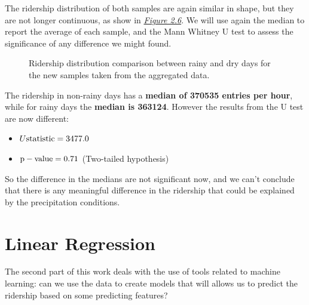 \documentclass[a4paper,12pt,english]{sphinxmanual}
\begin{document}
The ridership distribution of both samples are again similar in shape, but they
are not longer continuous, as show in {\hyperref[section1:figure26]{\emph{Figure 2.6}}}. We will use
again the median to report the average of each sample, and the Mann Whitney U
test to assess the significance of any difference we might found.
\begin{figure}[htbp]
\centering
\capstart

\caption{Ridership distribution comparison between rainy and dry days for the new
samples taken from the aggregated data.}\label{section1:figure26}\end{figure}

The ridership in non-rainy days has a \textbf{median of 370535 entries per hour},
while for rainy days the \textbf{median is 363124}. However the results from the U
test are now different:
\begin{itemize}
\item {} 
\(U \rm{statistic} = 3477.0\)

\item {} 
\(\rm{p-value} = 0.71\) (Two-tailed hypothesis)

\end{itemize}

So the difference in the medians are not significant now, and we can't conclude
that there is any meaningful difference in the ridership that could be explained
by the precipitation conditions.


\chapter{Linear Regression}
\label{section2:linear-regression}\label{section2::doc}
The second part of this work deals with the use of tools related to machine
learning: can we use the data to create models that will allows us to predict
the ridership based on some predicting features?
\end{document}
